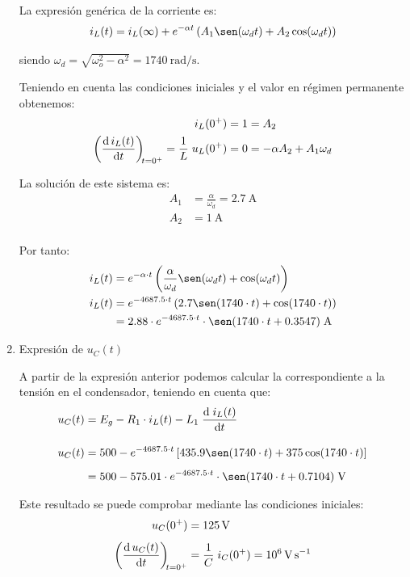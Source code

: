 \begin{enumerate}
  La expresión genérica de la corriente es:
  \[
    i_L(t) = i_L(\infty) + e^{-\alpha t} \left(A_1 \sen(\omega_d t) + A_2 \cos(\omega_d t)\right)
  \]

  siendo $\omega_d = \sqrt{\omega_o^2 - \alpha^2} = \SI{1740}{\radian\per\second}$.

  \vspace{3mm}
  Teniendo en cuenta las condiciones iniciales y el valor en régimen permanente obtenemos:
  \begin{align*}
    i_L(0^+) = 1 &= A_2\\
    \diff{\, i_L(t)}{t}[t = 0^+] = \frac{1}{L} \; u_L(0^+) = 0 &= -\alpha A_2 + A_1 \omega_d
  \end{align*}

  La solución de este sistema es:
  \begin{align*}
    A_1 &= \frac{\alpha}{\omega_d} = \qty{2.7}\ampere\\
    A_2 &= \qty{1}{\ampere}\\
  \end{align*}
  
  Por tanto:
  \begin{align*}
        i_L(t) &= e^{-\alpha \cdot t} \left(\frac{\alpha}{\omega_d} \sen(\omega_d t) + \cos(\omega_d t)\right)\\
    i_L(t) &= e^{-4687.5 \cdot t} \left(2.7 \sen(1740\cdot t) + \cos(1740 \cdot t)\right)\\
               &= 2.88 \cdot e^{-4687.5 \cdot t} \cdot \sen(1740\cdot t + 0.3547) \;\si{\ampere}
  \end{align*}

\vspace{2mm}

\item Expresión de $u_C(t)$

  A partir de la expresión anterior podemos calcular la correspondiente a la tensión en el condensador, teniendo en cuenta que:
  \begin{align*}
    u_C(t) &= E_g - R_1 \cdot i_L(t) - L_1 \; \diff{\; i_L(t)}{t} \\[10pt]
    u_C(t) &= 500 - e^{-4687.5 \cdot t} \left[435.9 \sen(1740\cdot t) + 375 \cos(1740 \cdot t)\right]\\[5pt]
           &= 500 - 575.01 \cdot e^{-4687.5 \cdot t} \cdot  \sen(1740\cdot t + 0.7104)\;\si{\volt}
  \end{align*}

  Este resultado se puede comprobar mediante las condiciones iniciales:
    \begin{align*}
    u_C(0^+) &= \qty{125}{\volt}\\[4pt]
    \diff{\, u_C(t)}{t}[t = 0^+] &= \frac{1}{C} \; i_C(0^+) = 10^6\,\si{\volt\per\second}\\
  \end{align*}

\end{enumerate}



